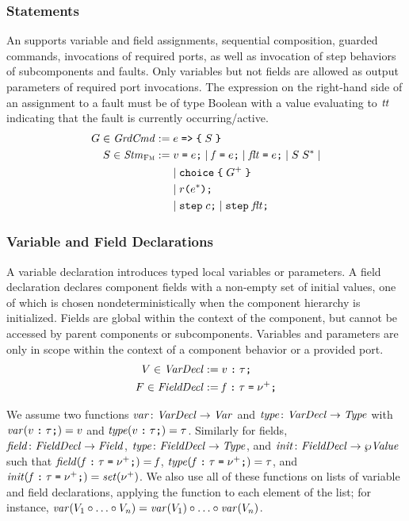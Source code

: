 \documentclass[a4paper,10pt,english]{article}
\begin{document}
\subsubsection{Statements}
An \Scm supports variable and field assignments, sequential composition, guarded commands,
invocations of required ports, as well as invocation of step behaviors of subcomponents and faults. Only variables but not fields
are allowed as output parameters of required port invocations. The expression on the right-hand side of an assignment to a fault
must be of type Boolean with a value evaluating to $\mathit{tt}$ indicating that the fault is currently occurring/active.
\begin{align*}
	G \in \mathit{GrdCmd} &:= e \; \texttt{=>} \; \texttt{\{} \; S \; \texttt{\}} \\
	S \in \mathit{Stm}_\textsc{Fm} &:=
		v\; \texttt{=}\; e \texttt{;} \mid
		\mathit{f}\; \texttt{=}\; e \texttt{;} \mid
		\mathit{flt}\; \texttt{=}\; e \texttt{;} \mid
		S \; S^* \mid
		\\&\phantom{:= \;} \mid 
		\texttt{choice} \; \texttt{\{} \; G^+ \; \texttt{\}}
		\\&\phantom{:= \;} \mid
		r \texttt{(}e^*\texttt{)} \texttt{;}
		\\&\phantom{:= \;} \mid
		\texttt{step} \; c \texttt{;} \mid \texttt{step} \; \mathit{flt} \texttt{;}
\end{align*}

\subsubsection{Variable and Field Declarations}
A variable declaration introduces typed local variables or parameters.
A field declaration declares component fields with a non-empty set of initial values, one of which is chosen
nondeterministically when the component hierarchy is initialized. Fields are global within the context of the component, but
cannot be accessed by parent components or subcomponents. Variables and parameters are only in scope within the context of a component behavior or
a provided port.
\begin{align*}
	V \in \mathit{VarDecl} &:= v \; \texttt{:} \; \tau \texttt{;} \\
	F \in \mathit{FieldDecl} &:= \mathit{f} \; \texttt{:} \; \tau \; \texttt{=} \; \nu^+ \texttt{;}
\end{align*}

We assume two functions $\mathit{var} \colon \mathit{VarDecl} \rightarrow \mathit{Var}$ and $\mathit{type} \colon \mathit{VarDecl} \rightarrow \mathit{Type}$ with
$\mathit{var}(v \; \texttt{:} \; \tau \texttt{;}) = v$ and $\mathit{type}(v \; \texttt{:} \; \tau \texttt{;}) = \tau$. Similarly for fields,
$\mathit{field} \colon \mathit{FieldDecl} \rightarrow \mathit{Field}$, $\mathit{type} \colon \mathit{FieldDecl} \rightarrow \mathit{Type}$, and $\mathit{init} \colon \mathit{FieldDecl} \rightarrow
\wp \mathit{Value}$ such that $\mathit{field}(\mathit{f} \; \texttt{:} \; \tau \; \texttt{=} \; \nu^+ \texttt{;}) = \mathit{f}$,
$\mathit{type}(\mathit{f} \; \texttt{:} \; \tau \; \texttt{=} \; \nu^+ \texttt{;}) = \tau$, and
$\mathit{init}(\mathit{f} \; \texttt{:} \; \tau \; \texttt{=} \; \nu^+ \texttt{;}) = \mathit{set}(\nu^+)$. We also use all of these functions
on lists of variable and field declarations, applying the function to each element of the list; for instance, $\mathit{var}(V_1
\circ \ldots \circ V_n) = \mathit{var}(V_1) \circ \ldots \circ \mathit{var}(V_n)$.
\end{document}
